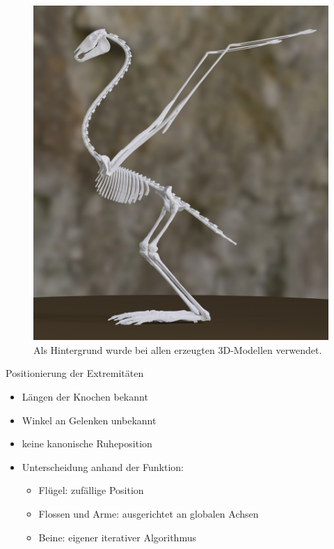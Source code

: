 \documentclass{beamer}
\begin{document}
\begin{frame}[focus]
 \begin{figure}
  \centering
  \includegraphics[height=0.85\textheight]{../../java_skeleton_generation/example_skeletons/bird.jpg}
  \caption{\scriptsize Als Hintergrund wurde bei allen erzeugten 3D-Modellen \cite{background} verwendet.}
 \end{figure}
\end{frame}

\begin{frame}{Positionierung der Extremitäten}
 \begin{itemize}
  \item Längen der Knochen bekannt
  \item Winkel an Gelenken unbekannt
  \item keine kanonische Ruheposition
  \item Unterscheidung anhand der Funktion:
  \begin{itemize}
   \item Flügel: zufällige Position
   \item Flossen und Arme: ausgerichtet an globalen Achsen
   \item Beine: eigener iterativer Algorithmus
  \end{itemize}
 \end{itemize}
\end{frame}
\end{document}
